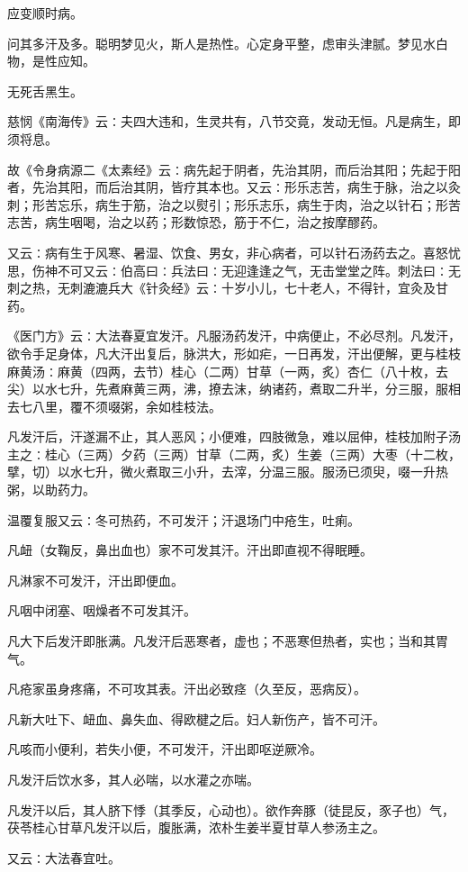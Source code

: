 \documentclass[a4paper,12pt,UTF8,twoside]{ctexbook}
\begin{document}
应变顺时病。

问其多汗及多。聪明梦见火，斯人是热性。心定身平整，虑审头津腻。梦见水白物，是性应知。

无死舌黑生。

慈悯《南海传》云∶夫四大违和，生灵共有，八节交竟，发动无恒。凡是病生，即须将息。

故《令身病源二《太素经》云∶病先起于阴者，先治其阴，而后治其阳；先起于阳者，先治其阳，而后治其阴，皆疗其本也。又云∶形乐志苦，病生于脉，治之以灸刺；形苦忘乐，病生于筋，治之以熨引；形乐志乐，病生于肉，治之以针石；形苦志苦，病生咽喝，治之以药；形数惊恐，筋于不仁，治之按摩醪药。

又云∶病有生于风寒、暑湿、饮食、男女，非心病者，可以针石汤药去之。喜怒忧思，伤神不可又云∶伯高曰∶兵法曰∶无迎逢逢之气，无击堂堂之阵。刺法曰∶无刺之热，无刺漉漉兵大《针灸经》云∶十岁小儿，七十老人，不得针，宜灸及甘药。

《医门方》云∶大法春夏宜发汗。凡服汤药发汗，中病便止，不必尽剂。凡发汗，欲令手足身体，凡大汗出复后，脉洪大，形如疟，一日再发，汗出便解，更与桂枝麻黄汤∶麻黄（四两，去节）桂心（二两）甘草（一两，炙）杏仁（八十枚，去尖）以水七升，先煮麻黄三两，沸，撩去沫，纳诸药，煮取二升半，分三服，服相去七八里，覆不须啜粥，余如桂枝法。

凡发汗后，汗遂漏不止，其人恶风；小便难，四肢微急，难以屈伸，桂枝加附子汤主之∶桂心（三两）夕药（三两）甘草（二两，炙）生姜（三两）大枣（十二枚，擘，切）以水七升，微火煮取三小升，去滓，分温三服。服汤已须臾，啜一升热粥，以助药力。

温覆复服又云∶冬可热药，不可发汗；汗退场门中疮生，吐痢。

凡衄（女鞠反，鼻出血也）家不可发其汗。汗出即直视不得眠睡。

凡淋家不可发汗，汗出即便血。

凡咽中闭塞、咽燥者不可发其汗。

凡大下后发汗即胀满。凡发汗后恶寒者，虚也；不恶寒但热者，实也；当和其胃气。

凡疮家虽身疼痛，不可攻其表。汗出必致痉（久至反，恶病反）。

凡新大吐下、衄血、鼻失血、得欧楗之后。妇人新伤产，皆不可汗。

凡咳而小便利，若失小便，不可发汗，汗出即呕逆厥冷。

凡发汗后饮水多，其人必喘，以水灌之亦喘。

凡发汗以后，其人脐下悸（其季反，心动也）。欲作奔豚（徒昆反，豕子也）气，茯苓桂心甘草凡发汗以后，腹胀满，浓朴生姜半夏甘草人参汤主之。

又云∶大法春宜吐。
\end{document}

